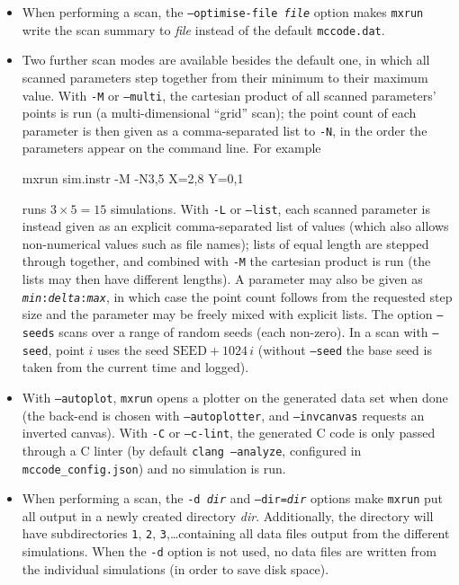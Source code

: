 \begin{itemize}
After running the simulation, the results will be written to the file
\verb+mccode.dat+ by default (see the \verb+--optimise-file+ option). This
file contains one line for each simulation
run giving the values of the scanned input variables along with the integrated
intensity and estimated error in all monitors. This file can be plotted with
any of the \verb+mxplot+ backends, see section~\ref{s:mxplot}.
\item When performing a scan, the \texttt{--optimise-file \textit{file}}
  option makes \verb+mxrun+ write the scan summary to \textit{file}
  instead of the default \verb+mccode.dat+.
\item Two further scan modes are available besides the default one, in which
  all scanned parameters step together from their minimum to their maximum
  value. With \texttt{-M} or \texttt{--multi}, the cartesian product of all
  scanned parameters' points is run (a multi-dimensional ``grid'' scan); the
  point count of each parameter is then given as a comma-separated list to
  \texttt{-N}, in the order the parameters appear on the command line. For
  example
\begin{bash}
mxrun sim.instr -M -N3,5 X=2,8 Y=0,1
\end{bash}
  runs $3\times5=15$ simulations. With \texttt{-L} or \texttt{--list}, each
  scanned parameter is instead given as an explicit comma-separated list of
  values (which also allows non-numerical values such as file names); lists
  of equal length are stepped through together, and combined with \texttt{-M}
  the cartesian product is run (the lists may then have different lengths).
  A parameter may also be given as \texttt{\textit{min}:\textit{delta}:\textit{max}},
  in which case the point count follows from the requested step size and the
  parameter may be freely mixed with explicit lists. The option
  \texttt{--seeds} scans over a range of random seeds (each non-zero). In a scan with
  \texttt{--seed}, point $i$ uses the seed $\mathrm{SEED}+1024\,i$ (without \texttt{--seed} the base seed is taken from the
  current time and logged).
\item With \texttt{--autoplot}, \verb+mxrun+ opens a plotter on the generated
  data set when done (the back-end is chosen with \texttt{--autoplotter}, and
  \texttt{--invcanvas} requests an inverted canvas). With
  \texttt{-C} or \texttt{--c-lint}, the generated C code is only passed
  through a C linter (by default \texttt{clang --analyze}, configured in
  \texttt{mccode\_config.json}) and no simulation is run.
\item When performing a scan, the \texttt{-d \textit{dir}} and
  \texttt{--dir=\textit{dir}} options make \verb+mxrun+ put all output in a
  newly created directory \textit{dir}. Additionally, the directory will
  have subdirectories \verb+1+, \verb+2+, \verb+3+,\ldots containing all
  data files output from the different simulations. When the \verb+-d+
  option is not used, no data files are written from the individual
  simulations (in order to save disk space).
\end{itemize}

